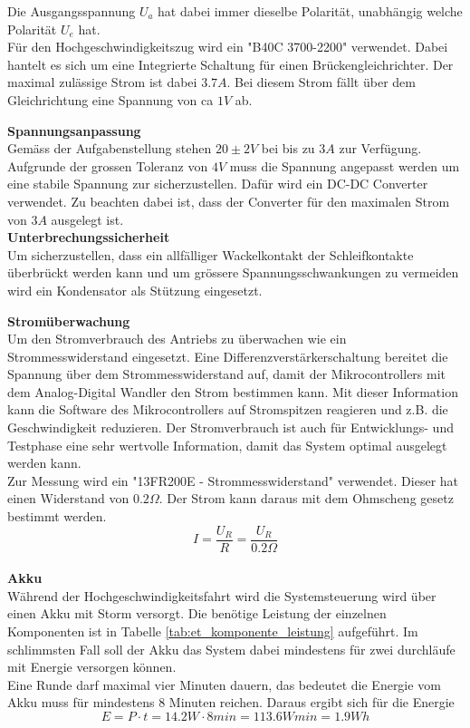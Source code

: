 \documentclass[../../main.tex]{subfiles}
\begin{document}
    Die Ausgangsspannung $U_a$ hat dabei immer dieselbe Polarität, unabhängig welche Polarität $U_e$ hat. \\
    Für den Hochgeschwindigkeitszug wird ein "B40C 3700-2200"  verwendet. Dabei hantelt es sich um eine Integrierte Schaltung für einen Brückengleichrichter. Der maximal zulässige Strom ist dabei $3.7A$. Bei diesem Strom fällt über dem Gleichrichtung eine Spannung von ca $1V$ ab.

    \textbf{Spannungsanpassung}\\
    Gemäss der Aufgabenstellung stehen $20\pm2V$ bei bis zu $3A$ zur Verfügung. Aufgrunde der grossen Toleranz von $4V$ muss die Spannung angepasst werden um eine stabile Spannung zur sicherzustellen. Dafür wird ein DC-DC Converter verwendet. Zu beachten dabei ist, dass der Converter für den maximalen Strom von $3A$ ausgelegt ist.\\

    \textbf{Unterbrechungssicherheit}\\
    Um sicherzustellen, dass ein allfälliger Wackelkontakt der Schleifkontakte überbrückt werden kann und um grössere Spannungsschwankungen zu vermeiden wird ein Kondensator als Stützung eingesetzt.

    \textbf{Stromüberwachung}\\
    Um den Stromverbrauch des Antriebs zu überwachen wie ein Strommesswiderstand eingesetzt. Eine Differenzverstärkerschaltung bereitet die Spannung über dem Strommesswiderstand auf, damit der Mikrocontrollers mit dem Analog-Digital Wandler den Strom bestimmen kann. Mit dieser Information kann die Software des Mikrocontrollers auf Stromspitzen reagieren und z.B. die Geschwindigkeit reduzieren. Der Stromverbrauch ist auch für Entwicklungs- und Testphase eine sehr wertvolle Information, damit das System optimal ausgelegt werden kann.  \\
    Zur Messung wird ein "13FR200E - Strommesswiderstand" verwendet. Dieser hat einen Widerstand von $0.2\Omega$. Der Strom kann daraus mit dem Ohmscheng gesetz bestimmt werden. $$I=\frac{U_R}{R}=\frac{U_R}{0.2\Omega} $$
    \\
    \textbf{Akku}\\
    Während der Hochgeschwindigkeitsfahrt wird die Systemsteuerung wird über einen Akku mit Storm versorgt. Die benötige Leistung der einzelnen Komponenten ist in Tabelle \ref{tab:et_komponente_leistung} aufgeführt. Im schlimmsten Fall soll der Akku das System dabei mindestens für zwei durchläufe mit Energie versorgen können.\\
    Eine Runde darf maximal vier Minuten dauern, das bedeutet die Energie vom Akku muss für mindestens 8 Minuten reichen. Daraus ergibt sich für die Energie $$E=P\cdot t = 14.2W \cdot 8min = 113.6Wmin = 1.9Wh$$
\end{document}
